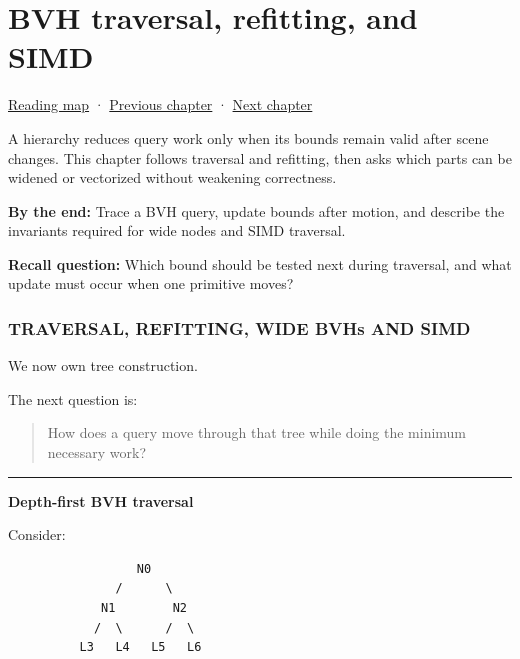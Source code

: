 \chapter{BVH traversal, refitting, and SIMD}\label{06-engine-ii-ch028-bvh-traversal-refitting-and-simd}\hypertarget{06-engine-ii-ch028}{}\label{stagechapter:06-engine-ii-ch028}

\hypertarget{06-engine-ii-ch028-bvh-traversal-refitting-and-simd}{}

\hyperref[volume-reading-map]{Reading map} · \hyperref[05-engine-i-ch018]{Previous chapter} · \hyperref[06-engine-ii-ch029-dynamic-spatial-indices-for-moving-worlds]{Next chapter}

A hierarchy reduces query work only when its bounds remain valid after scene changes. This chapter follows traversal and refitting, then asks which parts can be widened or vectorized without weakening correctness.

\textbf{By the end:} Trace a BVH query, update bounds after motion, and describe the invariants required for wide nodes and SIMD traversal.

\textbf{Recall question:} Which bound should be tested next during traversal, and what update must occur when one primitive moves?

\subsection{TRAVERSAL, REFITTING, WIDE BVHs AND SIMD}\label{06-engine-ii-ch028-traversal-refitting-wide-bvhs-and-simd}

\hypertarget{06-engine-ii-ch028-traversal-refitting-wide-bvhs-and-simd}{}

We now own tree construction.

The next question is:

\begin{quote}
How does a query move through that tree while doing the minimum necessary work?
\end{quote}

\begin{center}\rule{0.5\linewidth}{0.5pt}\end{center}

\textbf{Depth-first BVH traversal}

Consider:

\begin{verbatim}
                  N0
               /      \
             N1        N2
            /  \      /  \
          L3   L4   L5   L6
\end{verbatim}


